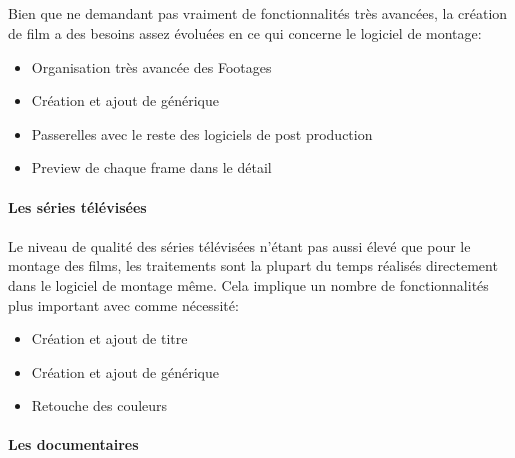 \subparagraph{}

Bien que ne demandant pas vraiment de fonctionnalités très avancées,
la création de film a des besoins assez évoluées en ce qui concerne
le logiciel de montage: \begin{itemize} \setlength{\itemsep}{2mm}
  \item{Organisation très avancée des Footages} \item{Création et
  ajout de générique} \item{Passerelles avec le reste des logiciels
  de post production} \item{Preview de chaque frame dans le détail}
\end{itemize}


\paragraph {Les séries télévisées}

\paragraph{}

Le niveau de qualité des séries télévisées n'étant pas aussi élevé
que pour le montage des films, les traitements sont la plupart du temps
réalisés directement dans le logiciel de montage même. Cela implique
un nombre de fonctionnalités plus important avec comme nécessité:
\begin{itemize} \setlength{\itemsep}{2mm}
  \item{Création et ajout de titre} \item{Création et ajout de
  générique} \item{Retouche des couleurs}
\end{itemize}

\paragraph {Les documentaires}

